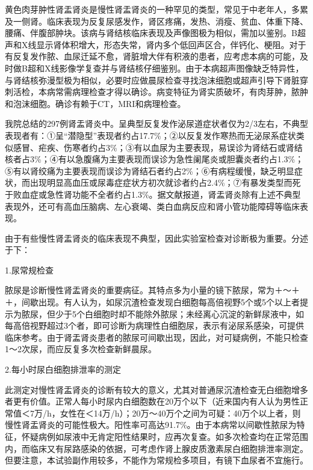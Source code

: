 黄色肉芽肿性肾盂肾炎是慢性肾盂肾炎的一种罕见的类型，常见于中老年人，多累及一侧肾。临床表现为反复尿感发作，肾区疼痛，发热、消瘦、贫血、体重下降、腰痛、伴腹部肿块。该病与肾结核临床表现及声像图极为相似，需加以鉴别。B超声和X线显示肾体积增大，形态失常，肾内多个低回声区合，伴钙化、梗阻。对于有反复发作脓、血尿迁延不愈，肾脏增大伴有积液的患者，应考虑本病的可能，及时做B超和X线影像学复查并与肾结核仔细鉴别。由于本病超声图像缺乏特异性，与肾结核弥漫型极为相似，必要时应做晨尿检查寻找泡沫细胞或超声引导下肾脏穿刺活检，本病常需病理检查才得以确诊。病变特征为肾实质破坏，有肉芽肿，脓肿和泡沫细胞。确诊有赖于CT，MRI和病理检查。

我院总结的297例肾盂肾炎中。呈典型反复发作泌尿道症状者仅为2/3左右，不典型表现者有：①呈“潜隐型”表现者约占17.7\%；②以反复发作寒热而无泌尿系症状类似感冒、疟疾、伤寒者约占3\%；③有以血尿为主要表现，易误诊为肾结石或肾结核者占3\%；④有以急腹痛为主要表现而误诊为急性阑尾炎或胆囊炎者约占1.3\%；⑤有以肾绞痛为主要表现而误诊为肾结石者约占2\%；⑥有病程缓慢，缺乏明显症状，而出现明显高血压或尿毒症症状方初次就诊者约占2.4\%；⑦有暴发类型而死于败血症或急性肾功能不全者约占1.3\%。据文献报道，肾盂肾炎除有上述不典型表现外，还可有高血压脑病、左心衰竭、类白血病反应和肾小管功能障碍等临床表现。

由于有些慢性肾盂肾炎的临床表现不典型，因此实验室检查对诊断极为重要。分述于下：

\hypertarget{text00283.htmlux5cux23CHP36-4-3-1-1-2-1}{}
1.尿常规检查

脓尿是诊断慢性肾盂肾炎的重要病征。其特点多为小量的镜下脓尿，常为＋～＋＋，间歇出现。有人认为，如尿沉渣检查发现白细胞每高倍视野5个或5个以上者提示为脓尿，但少于5个白细胞时却不能除外脓尿；未经离心沉淀的新鲜尿液中，如每高倍视野超过3个者，即可诊断为病理性白细胞尿，表示有泌尿系感染，可提供临床参考。由于肾盂肾炎患者的脓尿可间歇出现，因此，对可疑病例，不能只检查1～2次尿，而应反复多次检查新鲜晨尿。

\hypertarget{text00283.htmlux5cux23CHP36-4-3-1-1-2-2}{}
2.每小时尿白细胞排泄率的测定

此测定对慢性肾盂肾炎的诊断有较大的意义，尤其对普通尿沉渣检查无白细胞增多者更有价值。正常人每小时尿内白细胞数在20万个以下（近来国内有人认为男性正常值＜7万/h，女性在＜14万/h）；20万～40万个之间为可疑：40万个以上者，则慢性肾盂肾炎的可能性极大。阳性率可高达91.7\%。由于本病常以间歇性脓尿为特征，怀疑病例如尿液中无肯定阳性结果时，应再次复查。如多次检查均在正常范围内，而临床又有尿路感染的依据，可考虑作肾上腺皮质激素尿白细胞排泄率测定。但要注意，本试验副作用较多，不能作为常规检多项目，有镜下血尿者不宜施行。

